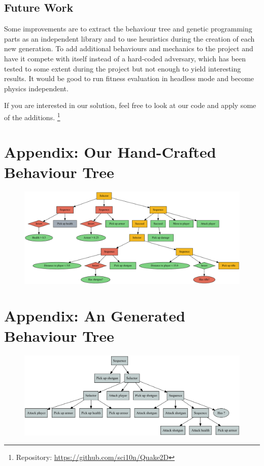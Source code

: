 \documentclass[a4paper, twocolumn]{article}
\begin{document}
    \vspace{-0.5em}

    \subsection*{Future Work}

    Some improvements are to extract the behaviour tree and genetic programming parts as an independent library and to use heuristics during the creation of each new generation. To add additional behaviours and mechanics to the project and have it compete with itself instead of a hard-coded adversary, which has been tested to some extent during the project but not enough to yield interesting results. It would be good to run fitness evaluation in headless mode and become physics independent.

    If you are interested in our solution, feel free to look at our code and apply some of the additions. \footnote{Repository: \url{https://github.com/sci10n/Quake2D}}

    \clearpage

    \nocite{*} %
    
    

    \onecolumn
    \clearpage


    \appendix

    \section{Appendix: Our Hand-Crafted Behaviour Tree} \label{app:hand_crafted}

    \begin{figure}[H]
        \centering
        \includegraphics[angle=90,height=0.92\textheight]{share/hand_crafted_behaviour_tree.pdf}
    \end{figure}

    \section{Appendix: An Generated Behaviour Tree} \label{app:generated}

    \begin{figure}[H]
        \centering
        \includegraphics[angle=90,height=0.92\textheight]{share/tree-fitness-3780.png}
    \end{figure}
\end{document}
